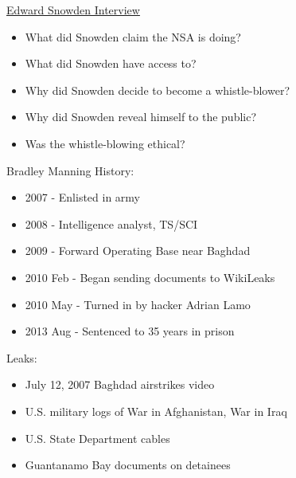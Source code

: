 \documentclass{beamer}
\begin{document}
\begin{frame}{\href{http://www.theguardian.com/world/video/2013/jun/09/nsa-whistleblower-edward-snowden-interview-video}{Edward Snowden Interview}}
\begin{itemize}
\item What did Snowden claim the NSA is doing?
\bigskip
\item What did Snowden have access to?
\bigskip
\item Why did Snowden decide to become a whistle-blower?
\bigskip
\item Why did Snowden reveal himself to the public?
\bigskip
\item Was the whistle-blowing ethical?
\end{itemize}
\end{frame}

\begin{frame}{Bradley Manning}
History:
\begin{itemize}
\item 2007 - Enlisted in army
\item 2008 - Intelligence analyst, TS/SCI
\item 2009 - Forward Operating Base near Baghdad
\item 2010 Feb - Began sending documents to WikiLeaks
\item 2010 May - Turned in by hacker Adrian Lamo
\item 2013 Aug - Sentenced to 35 years in prison
\end{itemize}
Leaks:
\begin{itemize}
\item July 12, 2007 Baghdad airstrikes video %
\item U.S. military logs of War in Afghanistan, War in Iraq  %
\item U.S. State Department cables %
\item Guantanamo Bay documents on detainees %
\end{itemize}
\end{frame}
\end{document}
